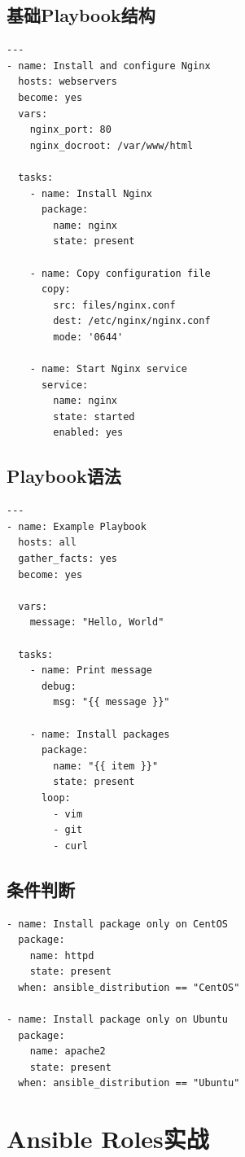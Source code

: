 \documentclass[12pt,UTF8]{ctexbook}
\begin{document}
\subsection*{基础Playbook结构}
\begin{lstlisting}
---
- name: Install and configure Nginx
  hosts: webservers
  become: yes
  vars:
    nginx_port: 80
    nginx_docroot: /var/www/html

  tasks:
    - name: Install Nginx
      package:
        name: nginx
        state: present

    - name: Copy configuration file
      copy:
        src: files/nginx.conf
        dest: /etc/nginx/nginx.conf
        mode: '0644'

    - name: Start Nginx service
      service:
        name: nginx
        state: started
        enabled: yes
\end{lstlisting}

\subsection*{Playbook语法}
\begin{lstlisting}
---
- name: Example Playbook
  hosts: all
  gather_facts: yes
  become: yes
  
  vars:
    message: "Hello, World"
  
  tasks:
    - name: Print message
      debug:
        msg: "{{ message }}"
    
    - name: Install packages
      package:
        name: "{{ item }}"
        state: present
      loop:
        - vim
        - git
        - curl
\end{lstlisting}

\subsection*{条件判断}
\begin{lstlisting}
- name: Install package only on CentOS
  package:
    name: httpd
    state: present
  when: ansible_distribution == "CentOS"

- name: Install package only on Ubuntu
  package:
    name: apache2
    state: present
  when: ansible_distribution == "Ubuntu"
\end{lstlisting}

\section{Ansible Roles实战}
\label{sec:ansible-roles}
\end{document}
